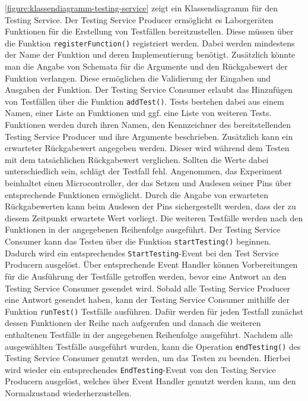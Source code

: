 \autoref{figure:klassendiagramm-testing-service} zeigt ein Klassendiagramm für den Testing Service. Der Testing Service Producer ermöglicht es Laborgeräten Funktionen für die Erstellung von Testfällen bereitzustellen. Diese müssen über die Funktion \texttt{registerFunction()} registriert werden. Dabei werden mindestens der Name der Funktion und deren Implementierung benötigt. Zusätzlich könnte man die Angabe von Schemata für die Argumente und den Rückgabewert der Funktion verlangen. Diese ermöglichen die Validierung der Eingaben und Ausgaben der Funktion. Der Testing Service Consumer erlaubt das Hinzufügen von Testfällen über die Funktion \texttt{addTest()}. Tests bestehen dabei aus einem Namen, einer Liste an Funktionen und ggf. eine Liste von weiteren Tests. Funktionen werden durch ihren Namen, den Kennzeichner des bereitstellenden Testing Service Producer und ihre Argumente beschrieben. Zusätzlich kann ein erwarteter Rückgabewert angegeben werden. Dieser wird während dem Testen mit dem tatsächlichen Rückgabewert verglichen. Sollten die Werte dabei unterschiedlich sein, schlägt der Testfall fehl. Angenommen, das Experiment beinhaltet einen Microcontroller, der das Setzen und Auslesen seiner Pins über entsprechende Funktionen ermöglicht. Durch die Angabe von erwarteten Rückgabewerten kann beim Auslesen der Pins sichergestellt werden, dass der zu diesem Zeitpunkt erwartete Wert vorliegt. Die weiteren Testfälle werden nach den Funktionen in der angegebenen Reihenfolge ausgeführt. Der Testing Service Consumer kann das Testen über die Funktion \texttt{startTesting()} beginnen. Dadurch wird ein entsprechendes \texttt{StartTesting}-Event bei den Test Service Producern ausgelöst. Über entsprechende Event Handler können Vorbereitungen für die Ausführung der Testfälle getroffen werden, bevor eine Antwort an den Testing Service Consumer gesendet wird. Sobald alle Testing Service Producer eine Antwort gesendet haben, kann der Testing Service Consumer mithilfe der Funktion \texttt{runTest()} Testfälle ausführen. Dafür werden für jeden Testfall zunächst dessen Funktionen der Reihe nach aufgerufen und danach die weiteren enthaltenen Testfälle in der angegebenen Reihenfolge ausgeführt. Nachdem alle ausgewählten Testfälle ausgeführt wurden, kann die Operation \texttt{endTesting()} des Testing Service Consumer genutzt werden, um das Testen zu beenden. Hierbei wird wieder ein entsprechendes \texttt{EndTesting}-Event von den Testing Service Producern ausgelöst, welches über Event Handler genutzt werden kann, um den Normalzustand wiederherzustellen.

